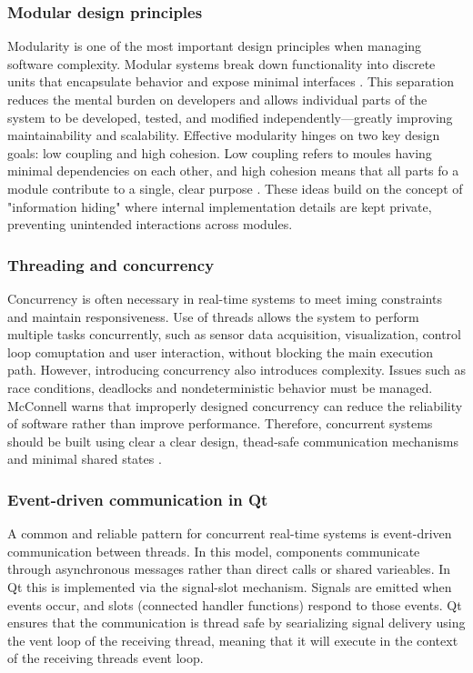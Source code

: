 \subsubsection{Modular design principles}
Modularity is one of the most important design principles when managing software complexity. Modular systems break down functionality into discrete units that encapsulate behavior and expose minimal interfaces \cite{steve_mcconnell_code_nodate}. This separation reduces the mental burden on developers and allows individual parts of the system to be developed, tested, and modified independently—greatly improving maintainability and scalability.
\newline \newline
Effective modularity hinges on two key design goals: low coupling and high cohesion. Low coupling refers to moules having minimal dependencies on each other, and high cohesion means that all parts fo a module contribute to a single, clear purpose \cite{steve_mcconnell_code_nodate}. These ideas build on the concept of "information hiding" \cite{parnas_criteria_1972} where internal implementation details are kept private, preventing unintended interactions across modules.

\subsubsection{Threading and concurrency}
Concurrency is often necessary in real-time systems to meet iming constraints and maintain responsiveness. Use of threads allows the system to perform multiple tasks concurrently, such as sensor data acquisition, visualization, control loop comuptation and user interaction, without blocking the main execution path.
\newline \newline
However, introducing concurrency also introduces complexity. Issues such as race conditions, deadlocks and nondeterministic behavior must be managed. McConnell \cite{mcconnell_code_2004} warns that improperly designed concurrency can reduce the reliability of software rather than improve performance. Therefore, concurrent systems should be built using clear a clear design, thead-safe communication mechanisms and minimal shared states \cite{noauthor_software_nodate}.

\subsubsection{Event-driven communication in Qt}
A common and reliable pattern for concurrent real-time systems is event-driven communication between threads. In this model, components communicate through asynchronous messages rather than direct calls or shared varieables. In Qt this is implemented via the signal-slot mechanism. Signals are emitted when events occur, and slots (connected handler functions) respond to those events. Qt ensures that the communication is thread safe by searializing signal delivery using the vent loop of the receiving thread, meaning that it will execute in the context of the receiving threads event loop. 

